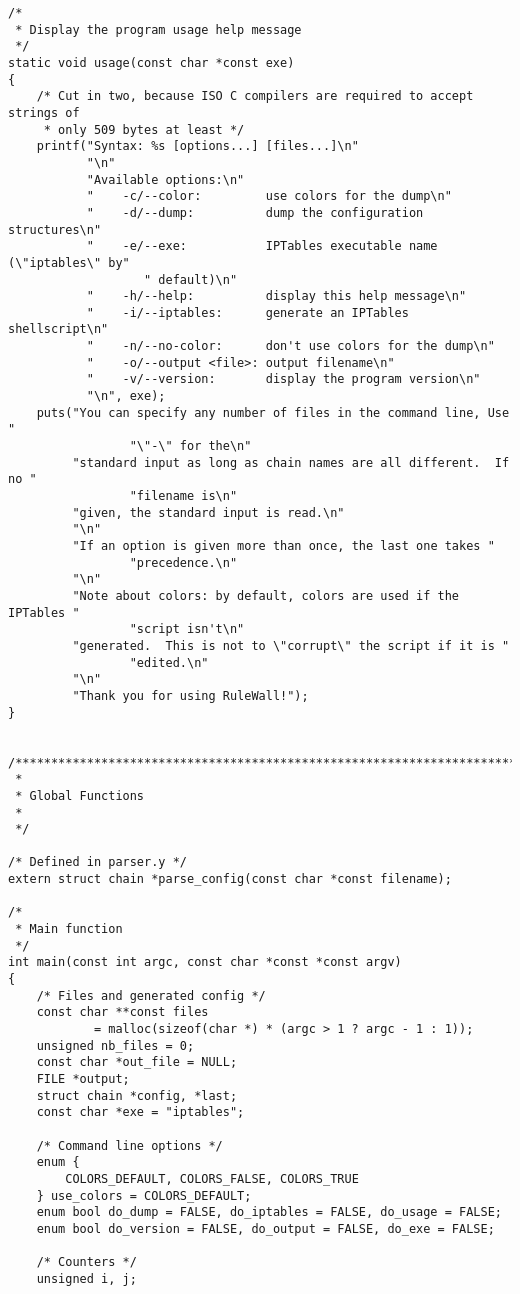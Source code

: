 \documentclass[a4paper,landscape,twocolumn,11pt]{article}
\begin{document}
\begin{lstlisting}
/*
 * Display the program usage help message
 */
static void usage(const char *const exe)
{
    /* Cut in two, because ISO C compilers are required to accept strings of
     * only 509 bytes at least */
    printf("Syntax: %s [options...] [files...]\n"
           "\n"
           "Available options:\n"
           "    -c/--color:         use colors for the dump\n"
           "    -d/--dump:          dump the configuration structures\n"
           "    -e/--exe:           IPTables executable name (\"iptables\" by"
                   " default)\n"
           "    -h/--help:          display this help message\n"
           "    -i/--iptables:      generate an IPTables shellscript\n"
           "    -n/--no-color:      don't use colors for the dump\n"
           "    -o/--output <file>: output filename\n"
           "    -v/--version:       display the program version\n"
           "\n", exe);
    puts("You can specify any number of files in the command line, Use "
                 "\"-\" for the\n"
         "standard input as long as chain names are all different.  If no "
                 "filename is\n"
         "given, the standard input is read.\n"
         "\n"
         "If an option is given more than once, the last one takes "
                 "precedence.\n"
         "\n"
         "Note about colors: by default, colors are used if the IPTables "
                 "script isn't\n"
         "generated.  This is not to \"corrupt\" the script if it is "
                 "edited.\n"
         "\n"
         "Thank you for using RuleWall!");
}


/*****************************************************************************
 *
 * Global Functions
 *
 */

/* Defined in parser.y */
extern struct chain *parse_config(const char *const filename);

/*
 * Main function
 */
int main(const int argc, const char *const *const argv)
{
    /* Files and generated config */
    const char **const files
            = malloc(sizeof(char *) * (argc > 1 ? argc - 1 : 1));
    unsigned nb_files = 0;
    const char *out_file = NULL;
    FILE *output;
    struct chain *config, *last;
    const char *exe = "iptables";

    /* Command line options */
    enum {
        COLORS_DEFAULT, COLORS_FALSE, COLORS_TRUE
    } use_colors = COLORS_DEFAULT;
    enum bool do_dump = FALSE, do_iptables = FALSE, do_usage = FALSE;
    enum bool do_version = FALSE, do_output = FALSE, do_exe = FALSE;

    /* Counters */
    unsigned i, j;


\end{lstlisting}
\end{document}
